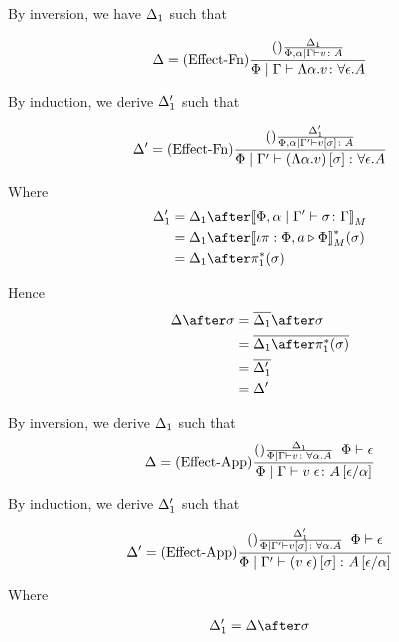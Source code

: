 \documentclass{report}
\begin{document}

By inversion, we have $\Delta_1$ such that

\begin{equation}
    \Delta = (\text{Effect-Fn}) \frac{(\text{}) \frac{\Delta_1}{\Phi,\alpha\mid\Gamma \vdash v \colon A}}{\Phi\mid\Gamma \vdash \Lambda \alpha. v \colon \forall \epsilon. A}
\end{equation}

By induction, we derive $\Delta_1'$ such that

\begin{equation}
    \Delta' = (\text{Effect-Fn}) \frac{(\text{}) \frac{\Delta_1'}{\Phi,\alpha\mid\Gamma' \vdash v\left[\sigma\right] \colon A}}{\Phi\mid\Gamma' \vdash (\Lambda \alpha. v)\left[\sigma\right] \colon \forall \epsilon. A}
\end{equation}

Where 
\begin{align}
    \D_1' & = \D_1\after\deno{\etyperelation{\P,\a}{\G'}{\si}{\G}}\\
    & = \D_1\after\deno{\wrel{\i\pi}{\P,a}{\P}}\star(\si)\\
    & = \D_1\after\pstar(\si)
\end{align}

Hence \begin{align}
    \D\after\si & = \bar{\D_1}\after\si\\
    & = \bar{\D_1\after\pstar(\si)}\\
    & = \bar{\D_1'}\\
    & = \D'
\end{align}

By inversion, we derive $\Delta_1$ such that
\begin{equation}
    \Delta = (\text{Effect-App}) \frac{(\text{}) \frac{\Delta_1}{\Phi\mid\Gamma \vdash v \colon \forall \alpha. A}\;\;\Phi\vdash \epsilon}{\Phi\mid\Gamma \vdash v\;\epsilon \colon A\left[\epsilon / \alpha\right]}
\end{equation}

By induction, we derive $\Delta_1'$ such that

\begin{equation}
    \Delta' = (\text{Effect-App}) \frac{(\text{}) \frac{\Delta_1'}{\Phi\mid\Gamma' \vdash v\left[\sigma\right] \colon \forall \alpha. A}\;\;\Phi\vdash \epsilon}{\Phi\mid\Gamma' \vdash (v\;\epsilon)\left[\sigma\right] \colon A\left[\epsilon / \alpha\right]}
\end{equation}

Where 

\begin{align}
    \D_1' = \D\after\si
\end{align}
\end{document}
